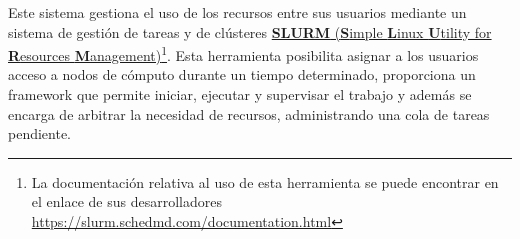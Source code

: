 
Este sistema gestiona el uso de los recursos entre sus usuarios mediante un sistema de gestión de tareas y de clús\-te\-res
\href{https://es.wikipedia.org/wiki/Simple\_Linux\_Utility\_for\_Resource\_Management}{\textbf{SLURM} (\textbf{S}imple \-\textbf{L}inux \-\textbf{U}tility for \textbf{R}e\-sour\-ces \-\textbf{M}ana\-ge\-ment)}\footnote{La documentación relativa al uso de esta herramienta se puede encontrar en el enlace de sus desarrolladores \href{https://slurm.schedmd.com/documentation.html}{https://slurm.schedmd.com/documentation.html}}. Esta herramienta posibilita asignar a los usuarios acceso a nodos de cómputo durante un tiempo determinado, proporciona un framework que permite iniciar, ejecutar y supervisar el trabajo y además se encarga de arbitrar la necesidad de recursos, administrando una cola de tareas pendiente. 

